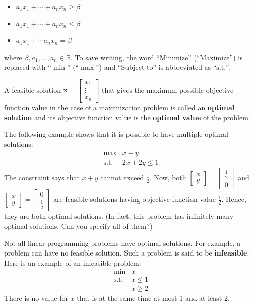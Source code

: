 \documentclass[]{book}
\providecommand{\tightlist}{%
  \setlength{\itemsep}{0pt}\setlength{\parskip}{0pt}}
\newcommand{\RR}{\mathbb{R}}
\renewcommand{\vec}[1]{\mathbf{#1}}
\theoremstyle{definition}
\theoremstyle{definition}
\theoremstyle{remark}
\begin{document}
\begin{itemize}
\tightlist
\item
  \(a_1 x_1 + \cdots + a_n x_n \geq \beta\)
\item
  \(a_1 x_1 + \cdots + a_n x_n \leq \beta\)
\item
  \(a_1 x_1 + \cdots a_n x_n = \beta\)
\end{itemize}

where \(\beta, a_1,\ldots, a_n \in \RR\). To save writing, the word
``Minimize'' (``Maximize'') is replaced with ``\(\min\)'' (``\(\max\)'')
and ``Subject to'' is abbreviated as ``\(\text{s.t.}\)''.

A feasible solution
\(\vec{x} = \begin{bmatrix} x_1 \\ \vdots \\ x_n\end{bmatrix}\) that
gives the maximum possible objective function value in the case of a
maximization problem is called an \textbf{optimal solution} and its
objective function value is the \textbf{optimal value} of the problem.

The following example shows that it is possible to have multiple optimal
solutions: \[
\begin{array}{rl}
\max & x + y\\
\text{s.t.} &  2x + 2y\leq 1
\end{array}
\] The constraint says that \(x+y\) cannot exceed \(\frac{1}{2}\). Now,
both
\(\begin{bmatrix}x\\y\end{bmatrix} = \begin{bmatrix}\frac{1}{2}\\ 0\end{bmatrix}\)
and
\(\begin{bmatrix}x\\y\end{bmatrix} = \begin{bmatrix}0\\\frac{1}{2}\end{bmatrix}\)
are feasible solutions having objective function value \(\frac{1}{2}\).
Hence, they are both optimal solutions. (In fact, this problem has
infinitely many optimal solutions. Can you specify all of them?)

Not all linear programming problems have optimal solutions. For example,
a problem can have no feasible solution. Such a problem is said to be
\textbf{infeasible}. Here is an example of an infeasible problem: \[
\begin{array}{rl}
\min & x \\
\text{s.t.} &  x \leq 1 \\
& x \geq 2
\end{array}
\] There is no value for \(x\) that is at the same time at most 1 and at
least 2.
\end{document}
